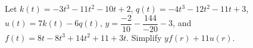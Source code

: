 Let $k(t)=-3t^3-11t^2-10t+2$, $q(t)=-4t^3-12t^2-11t+3$, $u(t)=7k(t)-6q(t)$, $y=\dfrac{-2}{10}-\dfrac{144}{-20}-3$, and $f(t)=8t-8t^3+14t^2+11+3t$. Simplify $yf(r)+11u(r)$.
